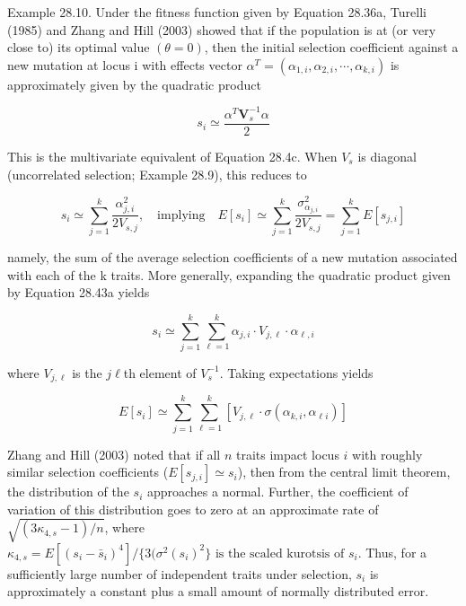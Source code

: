 \documentclass{article}
\begin{document}
Example 28.10. Under the fitness function given by Equation 28.36a, Turelli (1985) and Zhang and Hill (2003) showed that if the population is at (or very close to) its optimal value  $ (\theta = 0) $, then the initial selection coefficient against a new mutation at locus i with effects vector  $ \alpha^T = (\alpha_{1,i}, \alpha_{2,i}, \cdots, \alpha_{k,i}) $ is approximately given by the quadratic product

\begin{equation}
s_{i}\simeq\frac{\alpha^{T}\mathbf{V}_{s}^{-1}\alpha}{2}
\tag{28.43a}
\label{eq:28_43a}
\end{equation}

This is the multivariate equivalent of Equation 28.4c. When  $ V_s $ is diagonal (uncorrelated selection; Example 28.9), this reduces to

\begin{equation}
s_{i}\simeq\sum_{j=1}^{k}\frac{\alpha_{j,i}^{2}}{2V_{s,j}},\quad\mathrm{i m p l y i n g}\quad E[s_{i}]\simeq\sum_{j=1}^{k}\frac{\sigma_{\alpha_{j,i}}^{2}}{2V_{s,j}}=\sum_{j=1}^{k}E[s_{j,i}]
\tag{28.43b}
\label{eq:28_43b}
\end{equation}

namely, the sum of the average selection coefficients of a new mutation associated with each of the k traits. More generally, expanding the quadratic product given by Equation 28.43a yields

\begin{equation}
s_{i}\simeq\sum_{j=1}^{k}\sum_{\ell=1}^{k}\alpha_{j,i}\cdot V_{j,\ell}\cdot\alpha_{\ell,i}
\end{equation}

where  $ V_{j,\ell} $ is the  $ j\ell $th element of  $ V_{s}^{-1} $. Taking expectations yields

\begin{equation}
E[s_{i}]\simeq\sum_{j=1}^{k}\sum_{\ell=1}^{k}\left[V_{j,\ell}\cdot\sigma(\alpha_{k,i},\alpha_{\ell i})\right]
\tag{28.43c}
\label{eq:28_43c}
\end{equation}

Zhang and Hill (2003) noted that if all $n$ traits impact locus $i$ with roughly similar selection coefficients ($E[s_{j,i}] \simeq s_i$), then from the central limit theorem, the distribution of the $s_i$ approaches a normal. Further, the coefficient of variation of this distribution goes to zero at an approximate rate of $\sqrt{(3\kappa_{4,s} - 1)/n}$, where $\kappa_{4,s} = E[(s_i - \bar{s}_i)^4] / \{3(\sigma^2(s_i)^2\} \text{ is the scaled kurotsis of } s_i$. Thus, for a sufficiently large number of independent traits under selection, $s_i$ is approximately a constant plus a small amount of normally distributed error.
\end{document}
